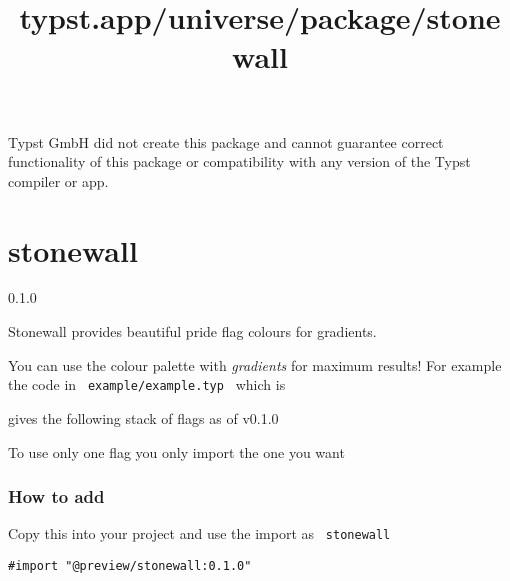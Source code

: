 Typst GmbH did not create this package and cannot guarantee correct
functionality of this package or compatibility with any version of the
Typst compiler or app.


\title{typst.app/universe/package/stonewall}

\label{banner}
\section{stonewall}\label{stonewall}

{ 0.1.0 }

Stonewall provides beautiful pride flag colours for gradients.

\label{readme}
You can use the colour palette with \emph{gradients} for maximum
results! For example the code in \texttt{\ example/example.typ\ } which
is

\begin{Shaded}
\begin{Highlighting}[]



\NormalTok{  ))}
\NormalTok{)}
\end{Highlighting}
\end{Shaded}

gives the following stack of flags as of v0.1.0

To use only one flag you only import the one you want

\subsubsection{How to add}\label{how-to-add}

Copy this into your project and use the import as \texttt{\ stonewall\ }

\begin{verbatim}
#import "@preview/stonewall:0.1.0"
\end{verbatim}

